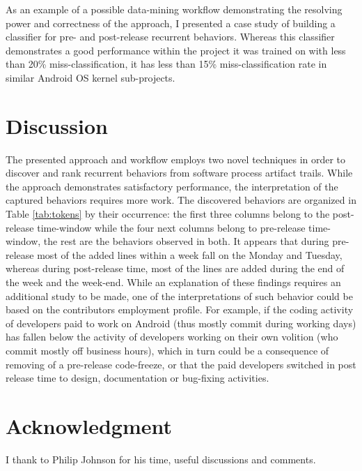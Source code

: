 \documentclass[conference]{worldcomp}
\begin{document}
As an example of a possible data-mining workflow demonstrating the resolving power 
and correctness of the approach, I presented a case study of building a classifier
for pre- and post-release recurrent behaviors. 
Whereas this classifier demonstrates a good performance within the project it was 
trained on with less than 20\% miss-classification, it has less than 15\% 
miss-classification rate in similar Android OS kernel sub-projects.


\section{Discussion}
The presented approach and workflow employs two novel techniques in order to discover and 
rank recurrent behaviors from software process artifact trails. While the approach 
demonstrates satisfactory performance, the interpretation of the captured behaviors requires
more work. The discovered behaviors are organized in Table \ref{tab:tokens} by their 
occurrence: the first three columns belong to the post-release time-window while
the four next columns belong to pre-release time-window, the rest are the behaviors observed 
in both. It appears that during pre-release most of the added lines within a week fall on the 
Monday and Tuesday, whereas during post-release time, most of the lines are added during the 
end of the week and the week-end. While an explanation of these findings requires an additional
study to be made, one of the interpretations of such behavior could be based on the 
contributors employment profile. For example, if the coding activity of developers paid 
to work on Android (thus mostly commit during working days) has fallen below the activity of 
developers working on their own volition (who commit mostly off business hours), which in turn 
could be a consequence of removing of a pre-release code-freeze, or that the paid developers 
switched in post release time to design, documentation or bug-fixing activities.

\section{Acknowledgment}
I thank to Philip Johnson for his time, useful discussions and comments.
\end{document}
